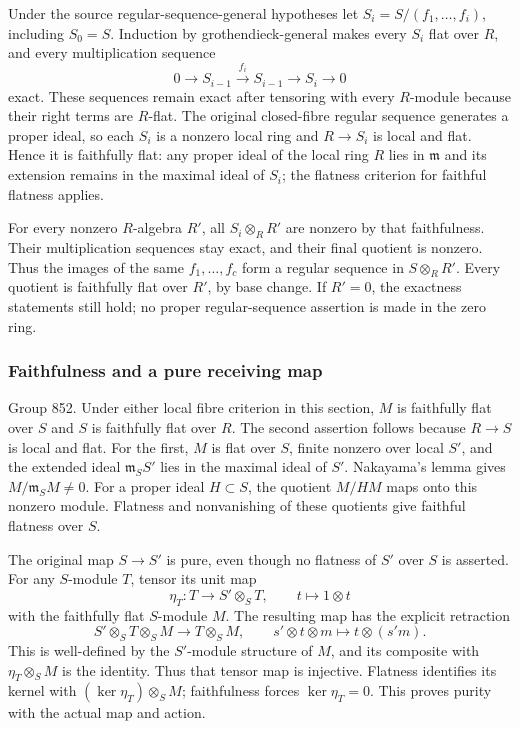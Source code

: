 Under the source regular-sequence-general hypotheses let \(S_i=S/(f_1,\ldots,f_i)\), including \(S_0=S\). Induction by grothendieck-general makes every \(S_i\) flat over \(R\), and every multiplication sequence \[
0\longrightarrow S_{i-1}\xrightarrow{f_i}S_{i-1}
\longrightarrow S_i\longrightarrow0
\] exact. These sequences remain exact after tensoring with every \(R\)-module because their right terms are \(R\)-flat. The original closed-fibre regular sequence generates a proper ideal, so each \(S_i\) is a nonzero local ring and \(R\to S_i\) is local and flat. Hence it is faithfully flat: any proper ideal of the local ring \(R\) lies in \(\mathfrak m\) and its extension remains in the maximal ideal of \(S_i\); the flatness criterion for faithful flatness applies.

For every nonzero \(R\)-algebra \(R'\), all \(S_i\otimes_R R'\) are nonzero by that faithfulness. Their multiplication sequences stay exact, and their final quotient is nonzero. Thus the images of the same \(f_1,\ldots,f_c\) form a regular sequence in \(S\otimes_R R'\). Every quotient is faithfully flat over \(R'\), by base change. If \(R'=0\), the exactness statements still hold; no proper regular-sequence assertion is made in the zero ring.

\subsubsection{Faithfulness and a pure receiving map}\label{algebra-proof-038-faithfulness-and-a-pure-receiving-map}

Group 852. Under either local fibre criterion in this section, \(M\) is faithfully flat over \(S\) and \(S\) is faithfully flat over \(R\). The second assertion follows because \(R\to S\) is local and flat. For the first, \(M\) is flat over \(S\), finite nonzero over local \(S'\), and the extended ideal \(\mathfrak m_SS'\) lies in the maximal ideal of \(S'\). Nakayama's lemma gives \(M/\mathfrak m_SM\ne0\). For a proper ideal \(H\subset S\), the quotient \(M/HM\) maps onto this nonzero module. Flatness and nonvanishing of these quotients give faithful flatness over \(S\).

The original map \(S\to S'\) is pure, even though no flatness of \(S'\) over \(S\) is asserted. For any \(S\)-module \(T\), tensor its unit map \[
\eta_T:T\longrightarrow S'\otimes_S T,\qquad t\longmapsto1\otimes t
\] with the faithfully flat \(S\)-module \(M\). The resulting map has the explicit retraction \[
S'\otimes_S T\otimes_S M\longrightarrow T\otimes_S M,\qquad
s'\otimes t\otimes m\longmapsto t\otimes(s'm).
\] This is well-defined by the \(S'\)-module structure of \(M\), and its composite with \(\eta_T\otimes_S M\) is the identity. Thus that tensor map is injective. Flatness identifies its kernel with \((\ker\eta_T)\otimes_S M\); faithfulness forces \(\ker\eta_T=0\). This proves purity with the actual map and action.

